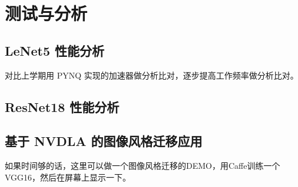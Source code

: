 \chapter{测试与分析}\label{chap:result}

\section{LeNet5 性能分析}

对比上学期用 PYNQ 实现的加速器做分析比对，逐步提高工作频率做分析比对。

\section{ResNet18 性能分析}

\section{基于 NVDLA 的图像风格迁移应用}

如果时间够的话，这里可以做一个图像风格迁移的DEMO，用Caffe训练一个VGG16，然后在屏幕上显示一下。